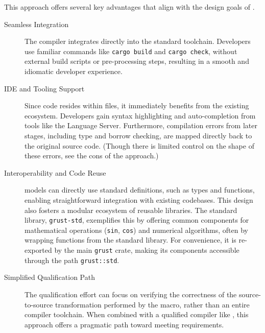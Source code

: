 This approach offers several key advantages that align with the design goals of \GRust.
\begin{description}
    \item[Seamless Integration] The compiler integrates directly into the standard \Rust toolchain.
          Developers use familiar commands like \texttt{cargo build} and \texttt{cargo check},
          without external build scripts or pre-processing steps, resulting in a smooth and
          idiomatic developer experience.

    \item[IDE and Tooling Support] Since \GRust code resides within \Rust files, it immediately
          benefits from the existing \Rust ecosystem. Developers gain syntax highlighting and
          auto-completion from tools like the \Rust Language Server. Furthermore, compilation errors
          from later stages, including type and borrow checking, are mapped directly back to the
          original \GRust source code. (Though there is limited control on the shape of these
          errors, see the cons of the approach.)

    \item[Interoperability and Code Reuse] \GRust models can directly use standard \Rust
          definitions, such as types and functions, enabling straightforward integration with
          existing codebases. This design also fosters a modular ecosystem of reusable libraries.
          The \GRust standard library, \texttt{grust-std}, exemplifies this by offering common
          components for mathematical operations (\eg \texttt{sin}, \texttt{cos}) and numerical
          algorithms, often by wrapping functions from the \Rust standard library. For convenience,
          it is re-exported by the main \texttt{grust} crate, making its components accessible
          through the path \texttt{grust::std}.

    \item[Simplified Qualification Path] The qualification effort can focus on verifying the
          correctness of the source-to-source transformation performed by the macro, rather
          than an entire compiler toolchain. When combined with a qualified \Rust compiler
          like \ferrocene, this approach offers a pragmatic path toward meeting \iso
          requirements.
\end{description}

